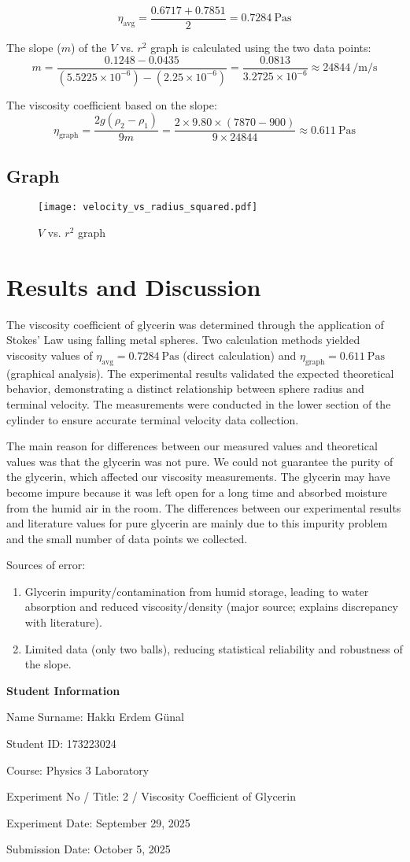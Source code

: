 \documentclass[12pt, a4paper]{article}
\begin{document}
\[ \eta_{\text{avg}} = \frac{0.6717 + 0.7851}{2} = \SI{0.7284}{\pascal\second} \]

The slope ($m$) of the $V$ vs. $r^2$ graph is calculated using the two data points:
\[ m = \frac{0.1248 - 0.0435}{(5.5225 \times 10^{-6}) - (2.25 \times 10^{-6})} = \frac{0.0813}{3.2725 \times 10^{-6}} \approx \SI{24844}{\per\metre\per\second} \]

The viscosity coefficient based on the slope:
\[ \eta_{\text{graph}} = \frac{2 g (\rho_2 - \rho_1)}{9 m} = \frac{2 \times 9.80 \times (7870 - 900)}{9 \times 24844} \approx \SI{0.611}{\pascal\second} \]

\subsection{Graph}
\begin{figure}[H]
	\centering
	\texttt{[image: velocity\_vs\_radius\_squared.pdf]}
	\caption{$V$ vs. $r^2$ graph}
\end{figure}

\section{Results and Discussion}
The viscosity coefficient of glycerin was determined through the application of Stokes' Law using falling metal spheres. Two calculation methods yielded viscosity values of $\eta_{\text{avg}} = \SI{0.7284}{\pascal\second}$ (direct calculation) and $\eta_{\text{graph}} = \SI{0.611}{\pascal\second}$ (graphical analysis). The experimental results validated the expected theoretical behavior, demonstrating a distinct relationship between sphere radius and terminal velocity. The measurements were conducted in the lower section of the cylinder to ensure accurate terminal velocity data collection.

The main reason for differences between our measured values and theoretical values was that the glycerin was not pure. We could not guarantee the purity of the glycerin, which affected our viscosity measurements. The glycerin may have become impure because it was left open for a long time and absorbed moisture from the humid air in the room. The differences between our experimental results and literature values for pure glycerin are mainly due to this impurity problem and the small number of data points we collected.

Sources of error:
\begin{enumerate}
	\item Glycerin impurity/contamination from humid storage, leading to water absorption and reduced viscosity/density (major source; explains discrepancy with literature).
	\item Limited data (only two balls), reducing statistical reliability and robustness of the slope.
\end{enumerate}

\newpage

\textbf{Student Information}

Name Surname: Hakkı Erdem Günal

Student ID: 173223024

Course: Physics 3 Laboratory

Experiment No / Title: 2 / Viscosity Coefficient of Glycerin

Experiment Date: September 29, 2025

Submission Date: October 5, 2025
\end{document}
